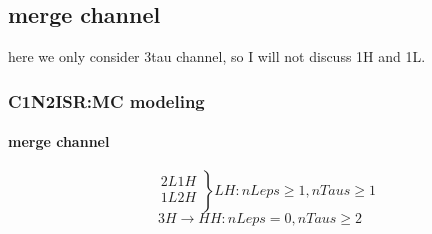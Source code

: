 \documentclass[usenames,dvipsnames]{beamer}
\begin{document}
\subsection{merge channel}
\begin{frame}
here we only consider 3tau channel, so I will not discuss 1H and 1L.
	\frametitle{C1N2ISR:MC modeling}
	\framesubtitle{merge channel}
	\begin{equation*}
		\left.
		\begin{split}
			& 2L1H\\
			& 1L2H\\
		\end{split}
		\right\} LH: nLeps\geq 1, nTaus\geq 1
		\end{equation*}
	\begin{equation*}
		3H\rightarrow HH: nLeps=0,nTaus\geq 2
	\end{equation*}
\end{frame}
\end{document}
